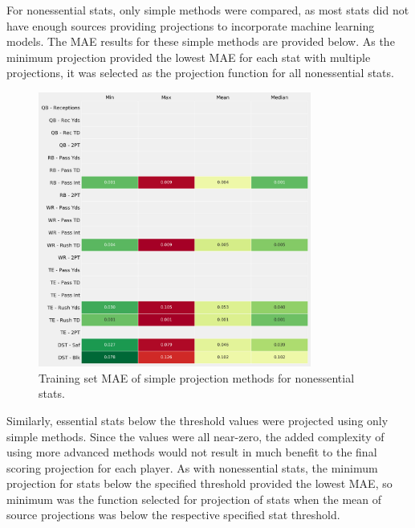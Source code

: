 \documentclass[12pt]{article}
\begin{document}
For nonessential stats, only simple methods were compared, as most stats did not have enough sources providing projections to incorporate machine learning models. The MAE results for these simple methods are provided below. As the minimum projection provided the lowest MAE for each stat with multiple projections, it was selected as the projection function for all nonessential stats.

\begin{figure}[H]
  \centering
  \includegraphics[width=0.8\textwidth]{../figures/nonessential_MAE_table}
  \caption{Training set MAE of simple projection methods for nonessential stats.}
\end{figure}


Similarly, essential stats below the threshold values were projected using only simple methods. Since the values were all near-zero, the added complexity of using more advanced methods would not result in much benefit to the final scoring projection for each player. As with nonessential stats, the minimum projection for stats below the specified threshold provided the lowest MAE, so minimum was the function selected for projection of stats when the mean of source projections was below the respective specified stat threshold.
\end{document}
